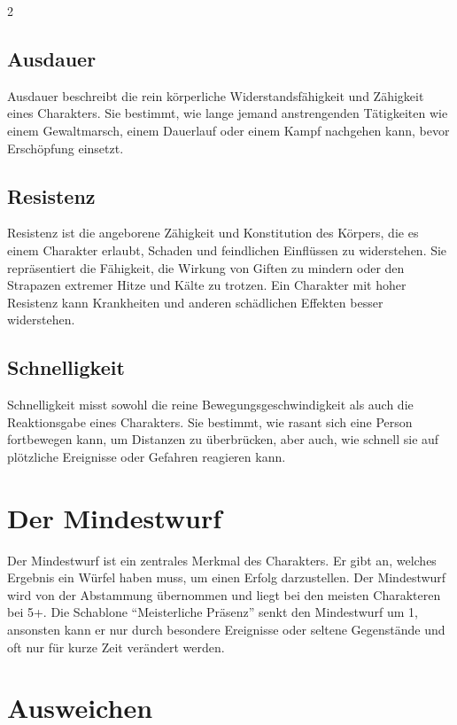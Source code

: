 \begin{multicols}{2}
\subsection{Ausdauer}

Ausdauer beschreibt die rein körperliche Widerstandsfähigkeit und Zähigkeit eines Charakters. Sie bestimmt, wie lange jemand anstrengenden Tätigkeiten wie einem Gewaltmarsch, einem Dauerlauf oder einem Kampf nachgehen kann, bevor Erschöpfung einsetzt.

\subsection{Resistenz}

Resistenz ist die angeborene Zähigkeit und Konstitution des Körpers, die es einem Charakter erlaubt, Schaden und feindlichen Einflüssen zu widerstehen. Sie repräsentiert die Fähigkeit, die Wirkung von Giften zu mindern oder den Strapazen extremer Hitze und Kälte zu trotzen. Ein Charakter mit hoher Resistenz kann Krankheiten und anderen schädlichen Effekten besser widerstehen.

\subsection{Schnelligkeit}

Schnelligkeit misst sowohl die reine Bewegungsgeschwindigkeit als auch die Reaktionsgabe eines Charakters. Sie bestimmt, wie rasant sich eine Person fortbewegen kann, um Distanzen zu überbrücken, aber auch, wie schnell sie auf plötzliche Ereignisse oder Gefahren reagieren kann.

\section{Der Mindestwurf}

Der Mindestwurf ist ein zentrales Merkmal des Charakters. Er gibt an, welches Ergebnis ein Würfel haben muss, um einen Erfolg darzustellen. Der Mindestwurf wird von der Abstammung übernommen und liegt bei den meisten Charakteren bei 5+. Die Schablone ``Meisterliche Präsenz'' senkt den Mindestwurf um 1, ansonsten kann er nur durch besondere Ereignisse oder seltene Gegenstände und oft nur für kurze Zeit verändert werden.

\section{Ausweichen}


\end{multicols}
